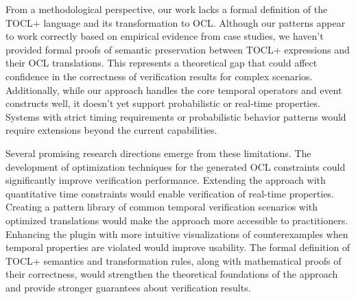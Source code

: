 From a methodological perspective, our work lacks a formal definition of the TOCL+ 
language and its transformation to OCL. Although our patterns appear to work correctly 
based on empirical evidence from case studies, we haven't provided formal proofs of 
semantic preservation between TOCL+ expressions and their OCL translations. This 
represents a theoretical gap that could affect confidence in the correctness of 
verification results for complex scenarios. Additionally, while our approach handles 
the core temporal operators and event constructs well, it doesn't yet support 
probabilistic or real-time properties. Systems with strict timing requirements or 
probabilistic behavior patterns would require extensions beyond the current 
capabilities.

Several promising research directions emerge from these limitations. The development 
of optimization techniques for the generated OCL constraints could significantly 
improve verification performance. Extending the approach with quantitative time 
constraints would enable verification of real-time properties. Creating a pattern 
library of common temporal verification scenarios with optimized translations would 
make the approach more accessible to practitioners. Enhancing the plugin with more 
intuitive visualizations of counterexamples when temporal properties are violated 
would improve usability. The formal definition of TOCL+ semantics and transformation 
rules, along with mathematical proofs of their correctness, would strengthen the 
theoretical foundations of the approach and provide stronger guarantees about 
verification results.